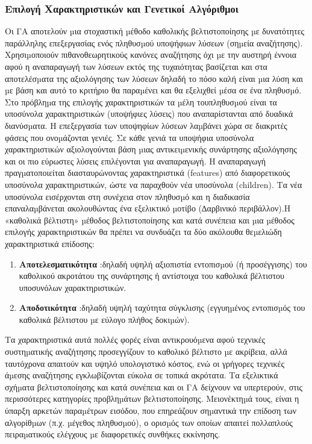 \subsubsection{Επιλογή Χαρακτηριστικών και Γενετικοί Αλγόριθμοι}
Οι ΓΑ αποτελούν µια στοχαστική µέθοδο καθολικής βελτιστοποίησης µε
δυνατότητες παράλληλης επεξεργασίας ενός πληθυσµού υποψήφιων λύσεων (σηµεία αναζήτησης). Χρησιµοποιούν πιθανοθεωρητικούς κανόνες αναζήτησης όχι µε την αυστηρή έννοια αφού η αναπαραγωγή των λύσεων εκτός της τυχαιότητας βασίζεται και στα αποτελέσµατα της αξιολόγησης των λύσεων δηλαδή το πόσο καλή είναι µια λύση και µε βάση και αυτό το κριτήριο θα παραµένει και θα εξελιχθεί µέσα σε ένα πληθυσµό. Στο πρόβληµα της επιλογής χαρακτηριστικών τα µέλη τουπληθυσµού είναι τα υποσύνολα χαρακτηριστικών (υποψήφιες λύσεις) που αναπαρίστανται από δυαδικά διανύσµατα. Η επεξεργασία των υποψηφίων λύσεων
λαµβάνει χώρα σε διακριτές φάσεις που ονοµάζονται γενιές. Σε κάθε γενιά τα υποψήφια υποσύνολα χαρακτηριστικών αξιολογούνται βάση µιας αντικειµενικής συνάρτησης αξιολόγησης και οι πιο εύρωστες λύσεις επιλέγονται για αναπαραγωγή. Η αναπαραγωγή πραγµατοποιείται διασταυρώνοντας χαρακτηριστικά (features) από διαφορετικούς υποσύνολα χαρακτηριστικών, ώστε να παραχθούν νέα υποσύνολα (children). Τα νέα υποσύνολα εισέρχονται στη συνέχεια στον πληθυσµό και η διαδικασία επαναλαµβάνεται ακολουθώντας ένα εξελικτικό µοτίβο (∆αρβινικό
περιβάλλον).Η «καθολικά βέλτιστη» µέθοδος βελτιστοποίησης και κατά συνέπεια και µια µέθοδος επιλογής χαρακτηριστικών θα πρέπει να συνδυάζει τα δύο ακόλουθα θεµελιώδη χαρακτηριστικά επίδοσης:
\begin{enumerate}
	\item \textbf{Αποτελεσματικότητα} :δηλαδή υψηλή αξιοπιστία εντοπισµού (ή προσέγγισης) του καθολικού ακροτάτου της συνάρτησης ή αντίστοιχα του καθολικά βέλτιστου υποσυνόλων χαρακτηριστικών.
	\item \textbf{Αποδοτικότητα} :δηλαδή υψηλή ταχύτητα σύγκλισης (εγγυηµένος εντοπισµός του καθολικά βέλτιστου µε εύλογο πλήθος δοκιµών).
\end{enumerate}

 Τα χαρακτηριστικά αυτά πολλές φορές είναι αντικρουόµενα αφού τεχνικές συστηµατικής αναζήτησης προσεγγίζουν το καθολικό βέλτιστο µε ακρίβεια, αλλά ταυτόχρονα απαιτούν και υψηλό υπολογιστικό κόστος, ενώ οι γρήγορες τεχνικές άµεσης αναζήτησης εγκλωβίζονται εύκολα σε τοπικά ακρότατα. Τα εξελικτικά σχήµατα βελτιστοποίησης και κατά συνέπεια και οι ΓΑ δείχνουν να υπερτερούν, στις περισσότερες κατηγορίες προβληµάτων βελτιστοποίησης. Μειονέκτηµά τους, είναι η ύπαρξη αρκετών παραµέτρων εισόδου, που επηρεάζουν σηµαντικά την επίδοση των αλγορίθµων (π.χ. µέγεθος πληθυσµού), ο ορισµός των οποίων απαιτεί πολλαπλούς πειραµατικούς ελέγχους µε διαφορετικές συνθήκες εκκίνησης.
 
